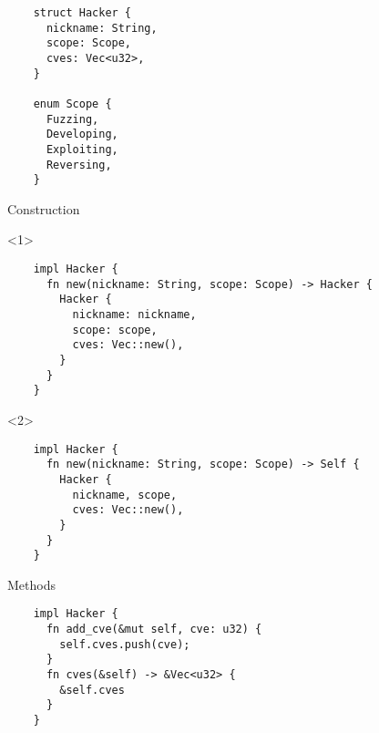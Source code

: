 \begin{frame}[fragile]{\insertsubsubsection}
  \begin{verbatim}
    struct Hacker {
      nickname: String,
      scope: Scope,
      cves: Vec<u32>,
    }

    enum Scope {
      Fuzzing,
      Developing,
      Exploiting,
      Reversing,
    }
  \end{verbatim}


\end{frame}

\begin{frame}[fragile]{Construction}
  \begin{onlyenv}<1>
    \begin{verbatim}
    impl Hacker {
      fn new(nickname: String, scope: Scope) -> Hacker {
        Hacker {
          nickname: nickname,
          scope: scope,
          cves: Vec::new(),
        }
      }
    }
  \end{verbatim}
  \end{onlyenv}
  \begin{onlyenv}<2>
    \begin{verbatim}
    impl Hacker {
      fn new(nickname: String, scope: Scope) -> Self {
        Hacker {
          nickname, scope,
          cves: Vec::new(),
        }
      }
    }
  \end{verbatim}
  \end{onlyenv}


\end{frame}

\begin{frame}[fragile]{Methods}
  \begin{verbatim}
    impl Hacker {
      fn add_cve(&mut self, cve: u32) {
        self.cves.push(cve);
      }
      fn cves(&self) -> &Vec<u32> {
        &self.cves
      }
    }
  \end{verbatim}


\end{frame}